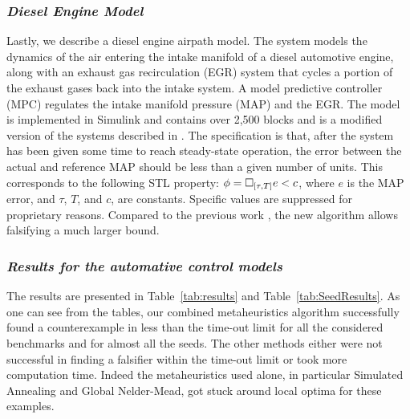 



\subsubsection*{{\em Diesel Engine Model}} \label{sec:diesel} 
Lastly, we describe a diesel engine airpath model.
The system models the dynamics of the air entering the intake manifold of a diesel automotive engine, along with an exhaust gas recirculation (EGR) system that cycles a portion of the exhaust gases back into the intake system. A model predictive controller (MPC) regulates the intake manifold pressure (MAP) and the EGR. The model is implemented in Simulink\textsuperscript{\textregistered} and contains over 2,500 blocks and is a modified version of the systems described in \cite{jin-tcad15}.
The specification is that, after the system has been given some time to reach steady-state operation, the error between the actual and reference MAP should be less than a given number of units.
This corresponds to the following STL property: $\phi=\Box_{[\tau,T]}e<c$, where $e$ is the MAP error, and $\tau$, $T$, and $c$, are constants. Specific values are suppressed for proprietary reasons. Compared to the previous work \cite{Dreossi2015}, the new algorithm allows falsifying a much larger bound. 


\subsubsection*{{\em Results for the automative control models}}
The results are presented in Table~\ref{tab:results} and Table~\ref{tab:SeedResults}.  
As one can see from the tables, our combined metaheuristics algorithm successfully found a counterexample in
less than the time-out limit for all the considered benchmarks and for almost all the seeds. 
The other methods either were not successful in finding a falsifier within the time-out limit or 
took more computation time. Indeed the metaheuristics used alone, in particular Simulated Annealing 
and Global Nelder-Mead, got stuck around local optima for these examples.


